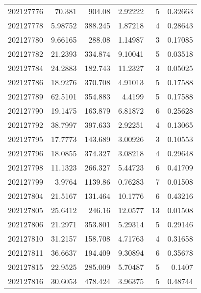 \begin{tabular}{rrrrrr}
 202127776 &         70.381   &      904.08   &            2.92222 &           5 & 0.32663 \\
 202127778 &          5.98752 &      388.245  &            1.87218 &           4 & 0.28643 \\
 202127780 &          9.66165 &      288.08   &            1.14987 &           3 & 0.17085 \\
 202127782 &         21.2393  &      334.874  &            9.10041 &           5 & 0.03518 \\
 202127784 &         24.2883  &      182.743  &           11.2327  &           3 & 0.05025 \\
 202127786 &         18.9276  &      370.708  &            4.91013 &           5 & 0.17588 \\
 202127789 &         62.5101  &      354.883  &            4.4199  &           5 & 0.17588 \\
 202127790 &         19.1475  &      163.879  &            6.81872 &           6 & 0.25628 \\
 202127792 &         38.7997  &      397.633  &            2.92251 &           4 & 0.13065 \\
 202127795 &         17.7773  &      143.689  &            3.00926 &           3 & 0.10553 \\
 202127796 &         18.0855  &      374.327  &            3.08218 &           4 & 0.29648 \\
 202127798 &         11.1323  &      266.327  &            5.44723 &           6 & 0.41709 \\
 202127799 &          3.9764  &     1139.86   &            0.76283 &           7 & 0.01508 \\
 202127804 &         21.5167  &      131.464  &           10.1776  &           6 & 0.43216 \\
 202127805 &         25.6412  &      246.16   &           12.0577  &          13 & 0.01508 \\
 202127806 &         21.2971  &      353.801  &            5.29314 &           5 & 0.29146 \\
 202127810 &         31.2157  &      158.708  &            4.71763 &           4 & 0.31658 \\
 202127811 &         36.6637  &      194.409  &            9.30894 &           6 & 0.35678 \\
 202127815 &         22.9525  &      285.009  &            5.70487 &           5 & 0.1407  \\
 202127816 &         30.6053  &      478.424  &            3.96375 &           5 & 0.48744 \\

\end{tabular}
